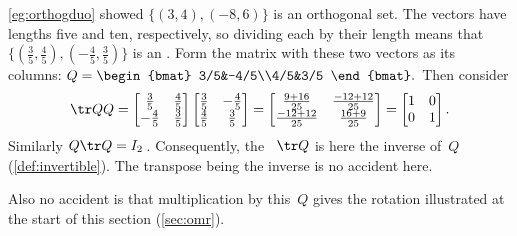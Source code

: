 \begin{example} 
\cref{eg:orthogduo} showed \(\{(3,4),(-8,6)\}\) is an orthogonal set.  
The vectors have lengths five and ten, respectively, so dividing each by their length means that \(\{(\frac35,\frac45),(-\frac45,\frac35)\}\) is an .
Form the matrix with these two vectors as its columns:
\(Q%
=\begin{bmat} 3/5&-4/5\\4/5&3/5 \end{bmat}.
\)
Then consider
\begin{equation*}
\tr QQ=\begin{bmatrix} \frac35&\frac45\\-\frac45&\frac35 \end{bmatrix}
\begin{bmatrix} \frac35&-\frac45\\\frac45&\frac35 \end{bmatrix}
=\begin{bmatrix} \frac{9+16}{25}&\frac{-12+12}{25}\\
\frac{-12+12}{25}&\frac{16+9}{25} \end{bmatrix}
=\begin{bmatrix} 1&0\\0&1 \end{bmatrix}.
\end{equation*}
Similarly \(Q\tr Q=I_2\)\,.
Consequently, the ~\(\tr Q\) is here the inverse of~\(Q\) (\cref{def:invertible}).  
The transpose being the inverse is no accident here.

Also no accident is that multiplication by this~\(Q\) gives the rotation illustrated at the start of this section (\cref{sec:omr}).
\end{example}




\begin{comment}
Could change this definition to $Q$~is {invertible} and $Q^{-1}=\tr Q$.  Then prove equivalence.  Use this for now.
\end{comment}

